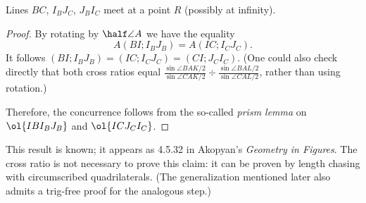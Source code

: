 \documentclass[11pt]{scrartcl}
\begin{document}
\begin{claim*}
  Lines $BC$, $I_BJ_C$, $J_BI_C$ meet at a point $R$
  (possibly at infinity).
\end{claim*}
\begin{proof}
  By rotating by $\half \angle A$ we have the equality
  \[ A(BI; I_B J_B) = A(IC;I_C J_C). \]
  It follows $(BI; I_B J_B) = (IC; I_C J_C) = (CI; J_C I_C)$.
  (One could also check directly that both cross ratios equal
  $\frac{\sin \angle BAK/2}{\sin \angle CAK/2}
  \div \frac{\sin \angle BAL/2}{\sin \angle CAL/2}$,
  rather than using rotation.)

  Therefore, the concurrence follows from the so-called
  \emph{prism lemma} on $\ol{I B I_B J_B}$ and $\ol{I C J_C I_C}$.
\end{proof}
%



\begin{remark*}
  This result is known;
  it appears as {4.5.32} in Akopyan's \emph{Geometry in Figures}.
  The cross ratio is not necessary to prove this claim:
  it can be proven by length chasing
  with circumscribed quadrilaterals.
  (The generalization mentioned later also admits a trig-free proof
  for the analogous step.)
\end{remark*}
\end{document}
